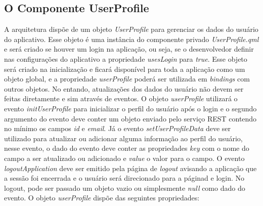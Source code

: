 \subsection{O Componente UserProfile}\label{sec:solucao-desenvolvida}
A arquitetura dispõe de um objeto \textit{UserProfile} para gerenciar os dados do usuário do aplicativo. Esse objeto é uma instância do componente privado \textit{UserProfile.qml} e será criado se houver um login na aplicação, ou seja, se o desenvolvedor definir nas configurações do aplicativo a propriedade \textit{usesLogin} para \textit{true}. Esse objeto será criado na inicialização e ficará disponível para toda a aplicação como um objeto global, e a propriedade \textit{userProfile} poderá ser utilizada em \textit{bindings} com outros objetos. No entando, atualizações dos dados do usuário não devem ser feitas diretamente e sim através de eventos. O objeto \textit{userProfile} utilizará o evento \textit{initUserProfile} para inicializar o perfil do usuário após o login e o segundo argumento do evento deve conter um objeto enviado pelo serviço REST contendo no mínimo os campos \textit{id} e \textit{email}. Já o evento \textit{setUserProfileData} deve ser utilizado para atualizar ou adicionar alguma informação ao perfil do usuário, nesse evento, o dado do evento deve conter as propriedades \textit{key} com o nome do campo a ser atualizado ou adicionado e \textit{value} o valor para o campo. O evento \textit{logoutApplication} deve ser emitido pela página de \textit{logout} avisando a aplicação que a sessão foi encerrada e o usuário será direcionado para a páginad e login. No logout, pode ser passado um objeto vazio ou simplesmente \textit{null} como dado do evento. O objeto \textit{userProfile} dispõe das seguintes propriedades:

